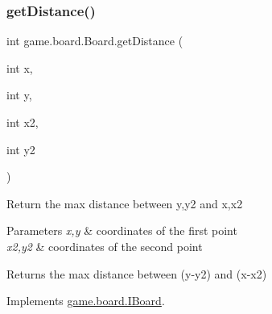 \mbox{\label{classgame_1_1board_1_1_board_a169a1f68a5c996127f2f762551405026}} 
\subsubsection{\texorpdfstring{get\+Distance()}{getDistance()}}
{\footnotesize\ttfamily int game.\+board.\+Board.\+get\+Distance (\begin{DoxyParamCaption}\item[{int}]{x,  }\item[{int}]{y,  }\item[{int}]{x2,  }\item[{int}]{y2 }\end{DoxyParamCaption})\hspace{0.3cm}{\ttfamily [inline]}}

Return the max distance between y,y2 and x,x2


\begin{DoxyParams}{Parameters}
{\em x,y} & coordinates of the first point \\
\hline
{\em x2,y2} & coordinates of the second point \\
\hline
\end{DoxyParams}
\begin{DoxyReturn}{Returns}
the max distance between (y-\/y2) and (x-\/x2) 
\end{DoxyReturn}


Implements \mbox{\hyperlink{interfacegame_1_1board_1_1_i_board_ae6a102ff58e3ee5d8cd4c4255790feff}{game.\+board.\+I\+Board}}.


